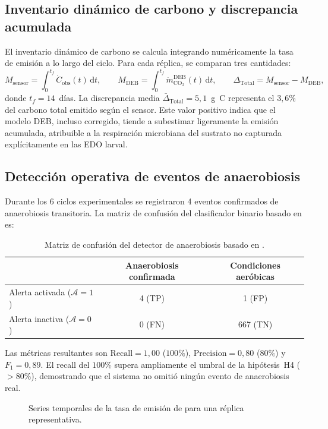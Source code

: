 \subsection{Inventario dinámico de carbono y discrepancia acumulada}

El inventario dinámico de carbono se calcula integrando numéricamente la tasa de emisión a lo largo del ciclo. Para cada réplica, se comparan tres cantidades:
\begin{equation}
M_{\mathrm{sensor}} = \int_{0}^{t_f} \dot{C}_{\mathrm{obs}}(t)\,\mathrm{d}t,
\qquad
M_{\mathrm{DEB}} = \int_{0}^{t_f} \dot{m}_{\mathrm{CO_2}}^{\mathrm{DEB}}(t)\,\mathrm{d}t,
\qquad
\Delta_{\mathrm{Total}} = M_{\mathrm{sensor}} - M_{\mathrm{DEB}},
\end{equation}
donde $t_f = 14$~días. La discrepancia media $\bar{\Delta}_{\mathrm{Total}} = 5{,}1$~g~C representa el $3{,}6\%$ del carbono total emitido según el sensor. Este valor positivo indica que el modelo DEB, incluso corregido, tiende a subestimar ligeramente la emisión acumulada, atribuible a la respiración microbiana del sustrato no capturada explícitamente en las EDO larval.

\subsection{Detección operativa de eventos de anaerobiosis}

Durante los 6 ciclos experimentales se registraron 4 eventos confirmados de anaerobiosis transitoria. La matriz de confusión del clasificador binario basado en  es:

\begin{table}[htbp]
\centering
\caption{Matriz de confusión del detector de anaerobiosis basado en .}
\label{tab:matriz_confusion}
\begin{tabular}{@{}lcc@{}}
\toprule
 & Anaerobiosis confirmada & Condiciones aeróbicas \\
\midrule
Alerta activada ($\mathcal{A}=1$) & 4 (TP) & 1 (FP) \\
Alerta inactiva ($\mathcal{A}=0$) & 0 (FN) & 667 (TN) \\
\bottomrule
\end{tabular}
\end{table}

Las métricas resultantes son $\mathrm{Recall} = 1{,}00$ ($100\%$), $\mathrm{Precision} = 0{,}80$ ($80\%$) y $F_1 = 0{,}89$. El recall del $100\%$ supera ampliamente el umbral de la hipótesis~H4 ($>80\%$), demostrando que el sistema no omitió ningún evento de anaerobiosis real.

\begin{figure}[htbp]
\centering
{}
\caption{Series temporales de la tasa de emisión de  para una réplica representativa.}
\label{fig:serie_temporal}
\end{figure}
